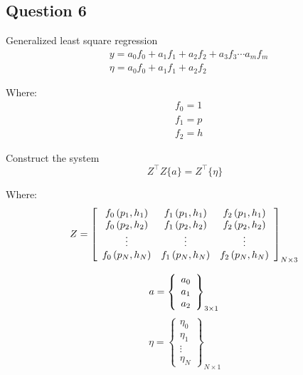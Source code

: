 \documentclass[12pt, a4paper]{article}
\numberwithin{equation}{section}
\begin{document}
\newpage
\subsection{Question 6}
Generalized least square regression
\begin{equation} 
\begin{aligned}
& y=a_0 f_0+a_1 f_1+a_2 f_2+a_3 f_3 \cdots a_m f_m \\
& \eta=a_0 f_0+a_1 f_1+a_2 f_2
\end{aligned}
\end{equation}

Where:
\begin{equation} 
\begin{aligned}
& f_0=1 \\
& f_1=p \\
& f_2=h
\end{aligned}
\end{equation}

Construct the system
\begin{equation}
    Z^{\top} Z\{a\}=Z^{\top}\{\eta\}
    \label{system}
\end{equation}

Where:
\begin{equation}
Z=\left[\begin{array}{ccc}
f_0\left(p_1, h_1\right) & f_1\left(p_1, h_1\right) & f_2\left(p_1, h_1\right) \\
f_0\left(p_2, h_2\right) & f_1\left(p_2, h_2\right) & f_2\left(p_2, h_2\right) \\
\vdots & \vdots & \vdots \\
f_0\left(p_N, h_N\right) & f_1\left(p_N, h_N\right) & f_2\left(p_N, h_N\right)
\end{array}\right]_{N \times 3} \\
\end{equation}

\begin{equation}
    a=\left\{\begin{array}{l}
    a_0 \\
    a_1 \\
    a_2
\end{array}\right\}_{3 \times 1} \\
\end{equation}
\begin{equation}
    \eta=\left\{\begin{array}{l}
    \eta_0 \\
    \eta_1 \\
    \vdots \\
    \eta_N
\end{array}\right\}_{N \times 1}
\end{equation}
\end{document}
